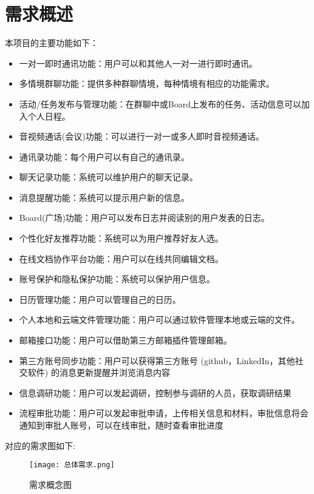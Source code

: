 \section{\color{red}需求概述}
本项目的主要功能如下：
\begin{itemize}
	\item 一对一即时通讯功能：用户可以和其他人一对一进行即时通讯。
	\item 多情境群聊功能：提供多种群聊情境，每种情境有相应的功能需求。
	\item 活动/任务发布与管理功能：在群聊中或Board上发布的任务、活动信息可以加入个人日程。
	\item 音视频通话(会议)功能：可以进行一对一或多人即时音视频通话。
	\item 通讯录功能：每个用户可以有自己的通讯录。
	\item 聊天记录功能：系统可以维护用户的聊天记录。
	\item 消息提醒功能：系统可以提示用户新的信息。
	\item Board(广场)功能：用户可以发布日志并阅读别的用户发表的日志。
	\item 个性化好友推荐功能：系统可以为用户推荐好友人选。
	\item 在线文档协作平台功能：用户可以在线共同编辑文档。
	\item 账号保护和隐私保护功能：系统可以保护用户信息。
	\item 日历管理功能：用户可以管理自己的日历。
	\item 个人本地和云端文件管理功能：用户可以通过软件管理本地或云端的文件。
	\item 邮箱接口功能：用户可以借助第三方邮箱插件管理邮箱。
	\item \color{red} 第三方账号同步功能：用户可以获得第三方账号 (github，LinkedIn，其他社交软件) 的消息更新提醒并浏览消息内容
	\item \color{red} 信息调研功能：用户可以发起调研，控制参与调研的人员，获取调研结果
	\item \color{red} 流程审批功能：用户可以发起审批申请，上传相关信息和材料，审批信息将会通知到审批人账号，可以在线审批，随时查看审批进度
\end{itemize}

{\color{red} 对应的需求图如下:}
\newpage
\begin{figure}[ht]
            \centering
            \texttt{[image: 总体需求.png]}\label{tab:classification}
            \caption{\color{red} 需求概念图}\label{fig:noted-figure}
        \end{figure}


